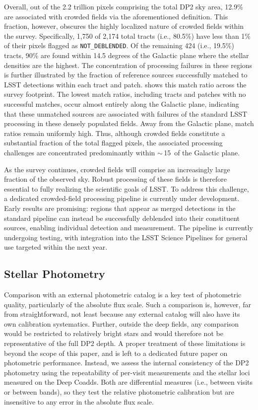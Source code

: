 Overall, out of the 2.2 trillion pixels comprising the total \gls{DP2} sky area, 12.9\% are associated with crowded fields via the aforementioned definition.
This fraction, however, obscures the highly localized nature of crowded fields within the survey.
Specifically, 1,750 of 2,174 total tracts (i.e., 80.5\%) have less than 1\% of their pixels flagged as \texttt{NOT\_DEBLENDED}.
Of the remaining 424 (i.e., 19.5\%) tracts, 90\% are found within 14.5 degrees of the Galactic plane where the stellar densities are the highest.
The concentration of processing failures in these regions is further illustrated by the fraction of reference sources successfully matched to LSST detections within each tract and \gls{patch}.
 shows this match ratio across the survey \gls{footprint}.
The lowest match ratios, including tracts and patches with no successful matches, occur almost entirely along the Galactic plane, indicating that these unmatched sources are associated with failures of the standard \gls{LSST} processing in these densely populated fields.
Away from the Galactic plane, match ratios remain uniformly high.
Thus, although crowded fields constitute a substantial fraction of the total flagged pixels, the associated processing challenges are concentrated predominantly within $\sim$\,15\degr\ of the Galactic plane.

As the survey continues, crowded fields will comprise an increasingly large fraction of the observed sky.
Robust processing of these fields is therefore essential to fully realizing the scientific goals of \gls{LSST}.
To address this challenge, a dedicated crowded-field processing \gls{pipeline} is currently under development.
Early results are promising: regions that appear as merged detections in the standard \gls{pipeline} can instead be successfully deblended into their constituent sources, enabling individual detection and measurement.
The pipeline is currently undergoing testing, with integration into the LSST \gls{Science Pipelines} for general use targeted within the next year.

\subsection{Stellar Photometry}
Comparison with an external photometric catalog is a key test of photometric quality, particularly of the absolute \gls{flux} scale.
Such a comparison is, however, far from straightforward, not least because any external catalog will also have its own \gls{calibration} systematics.
Further, outside the deep fields, any comparison would be restricted to relatively bright stars and would therefore not be representative of the full \gls{DP2} depth.
A proper treatment of these limitations is beyond the scope of this paper, and is left to a dedicated future paper on photometric performance.
Instead, we assess the internal consistency of the \gls{DP2} photometry using the repeatability of per-visit measurements and the stellar loci measured on the Deep Coadds.
Both are differential measures (i.e., between visits or between bands), so they test the relative photometric \gls{calibration} but are insensitive to any error in the absolute flux scale.

